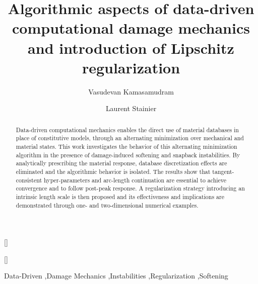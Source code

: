 \documentclass[10pt]{cas-sc}
\begin{document}
\let\WriteBookmarks\relax
\def\floatpagepagefraction{1}
\def\textpagefraction{.001}

\title [mode = title]{Algorithmic aspects of data-driven computational damage mechanics and introduction of Lipschitz regularization}                      
%
%


\author[2,1]{Vasudevan Kamasamudram}[]
\fnmark[1]



\author[1]{Laurent Stainier}[]




\begin{abstract}
Data-driven computational mechanics enables the direct use of material databases in place of constitutive models, through an alternating minimization over mechanical and material states. This work investigates the behavior of this alternating minimization algorithm in the presence of damage-induced softening and snapback instabilities. By analytically prescribing the material response, database discretization effects are eliminated and the algorithmic behavior is isolated. The results show that tangent-consistent hyper-parameters and arc-length continuation are essential to achieve convergence and to follow post-peak response. A regularization strategy introducing an intrinsic length scale is then proposed and its effectiveness and implications are demonstrated through one- and two-dimensional numerical examples.
\end{abstract}

\begin{keywords}
	Data-Driven \sep Damage Mechanics \sep Instabilities \sep Regularization \sep Softening
\end{keywords}
\end{document}

